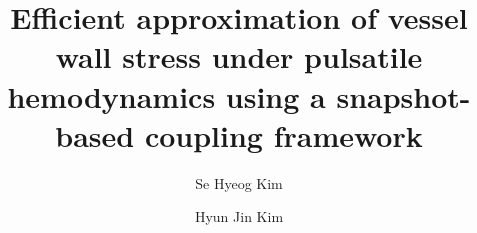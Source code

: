 \documentclass[preprint,12pt]{elsarticle}
\usepackage{xcolor,color}
\usepackage{soul}
\usepackage{amssymb}
\usepackage{amsmath}
\usepackage{booktabs}
\usepackage{pdflscape}
\usepackage{makecell}
\usepackage{kotex}
\usepackage{multirow}



\begin{frontmatter}

\title{Efficient approximation of vessel wall stress under pulsatile hemodynamics using a snapshot-based coupling framework}

\author[label1,label2]{Se Hyeog Kim}
\author[label1]{Hyun Jin Kim}

\begin{abstract}
Fluid--structure interaction (FSI) analysis is essential for evaluating vessel-wall stress ... (<=250 words).
\end{abstract}

\begin{keyword}
Fluid--structure interaction \sep Vessel wall stress \sep Reduced-order modeling \sep Pulsatile hemodynamics \sep Snapshot-based coupling
\end{keyword}

\end{frontmatter}

